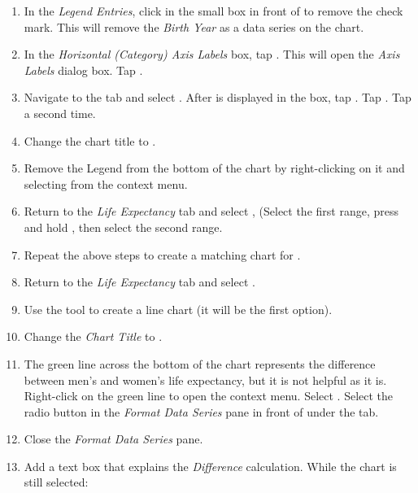 \begin{enumbox}
	\begin{enumerate}
		\item In the \textit{Legend Entries}, click in the small box in front of  to remove the check mark. This will remove the \textit{Birth Year} as a data series on the chart.
		\item In the \textit{Horizontal (Category) Axis Labels} box, tap . This will open the \textit{Axis Labels} dialog box. Tap .
		\item Navigate to the  tab and select . After  is displayed in the box, tap . Tap . Tap  a second time.
		\item Change the chart title to .
		\item Remove the Legend from the bottom of the chart by right-clicking on it and selecting  from the context menu.
		\item Return to the \textit{Life Expectancy} tab and select ,  (Select the first range, press and hold , then select the second range.
		\item Repeat the above steps to create a matching chart for .
		\item Return to the \textit{Life Expectancy} tab and select .
		\item Use the  tool to create a line chart (it will be the first option).
		\item Change the \textit{Chart Title} to .
		\item The green line across the bottom of the chart represents the difference between men's and women's life expectancy, but it is not helpful as it is. Right-click on the green line to open the context menu. Select . Select the radio button in the \textit{Format Data Series} pane in front of  under the  tab.
		\item Close the \textit{Format Data Series} pane.
		\item Add a text box that explains the \textit{Difference} calculation. While the chart is still selected:
		

\end{enumerate}
\end{enumbox}
